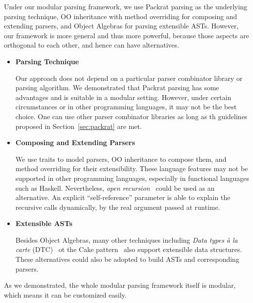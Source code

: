 Under our modular parsing framework, we use Packrat parsing as the underlying parsing technique, OO inheritance with method overriding for composing and extending parsers, and Object Algebras for parsing extensible ASTs. However, our framework is more general and thus more powerful, because those aspects are orthogonal to each other, and hence can have alternatives.

\begin{itemize}

\item {\bf Parsing Technique}

Our approach does not depend on a particular parser combinator library
or parsing algorithm. We demonstrated that Packrat parsing has some
advantages and is suitable in a modular setting. However, under
certain circumstances or in other programming languages, it may not be
the best choice. One can use other parser combinator libraries as long
as th guidelines proposed in Section~\ref{sec:packrat} are met.

\item {\bf Composing and Extending Parsers}

  We use traits to model parsers, OO inheritance to compose them, and
  method overriding for their extensibility. These language features
  may not be supported in other programming languages, especially in
  functional languages such as Haskell. Nevertheless, \textit{open
    recursion}~\cite{CookThesis} could be used as an alternative. An explicit
  ``self-reference'' parameter is able to explain the recursive calls
  dynamically, by the real argument passed at runtime.

\item {\bf Extensible ASTs}

Besides Object Algebras, many other techniques including \textit{Data
  types à la carte} (DTC)~\cite{swierstra2008data} ot the Cake pattern~\cite{odersky2005independently} also support extensible data structures. These alternatives could also be adopted to build ASTs and corresponding parsers.

\end{itemize}

As we demonstrated, the whole modular parsing framework itself is
modular, which means it can be customized easily. 
